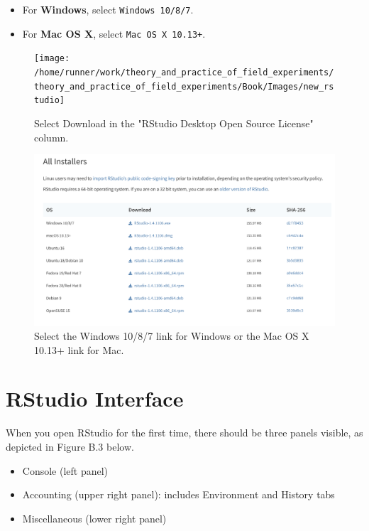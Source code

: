 \documentclass[12pt,]{book}
\providecommand{\tightlist}{%
  \setlength{\itemsep}{0pt}\setlength{\parskip}{0pt}}
\begin{document}
\begin{itemize}
\tightlist
\item
  For \textbf{Windows}, select \texttt{Windows\ 10/8/7}.
\item
  For \textbf{Mac OS X}, select \texttt{Mac\ OS\ X\ 10.13+}.
\end{itemize}

\begin{figure}
\texttt{[image: /home/runner/work/theory\_and\_practice\_of\_field\_experiments/theory\_and\_practice\_of\_field\_experiments/Book/Images/new\_rstudio]} \caption{Select Download in the "RStudio Desktop Open Source License" column.}\label{fig:rstudiopng}
\end{figure}

\begin{figure}
\includegraphics[width=0.8\linewidth]{Images/rstudio_download} \caption{Select the Windows 10/8/7 link for Windows or the Mac OS X 10.13+ link for Mac.}\label{fig:rstudiodownload}
\end{figure}

\hypertarget{rstudio-interface}{%
\section{RStudio Interface}\label{rstudio-interface}}

When you open RStudio for the first time, there should be three panels visible, as depicted in Figure B.3 below.

\begin{itemize}
\tightlist
\item
  Console (left panel)
\item
  Accounting (upper right panel): includes Environment and History tabs
\item
  Miscellaneous (lower right panel)
\end{itemize}
\end{document}
